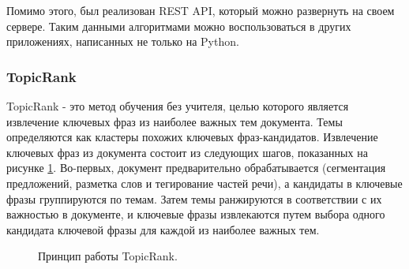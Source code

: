 \documentclass[14pt]{matmex-diploma-custom}
\begin{document}
Помимо этого, был реализован REST API, который можно развернуть на своем сервере.
Таким данными алгоритмами можно воспользоваться в других приложениях, написанных не
только на Python.


\subsubsection{TopicRank}
TopicRank - это метод обучения без учителя, целью которого является извлечение ключевых фраз из наиболее важных тем документа. Темы определяются как кластеры похожих ключевых фраз-кандидатов. Извлечение ключевых фраз из документа состоит из следующих шагов, показанных на рисунке \ref{topicrank}. Во-первых, документ предварительно обрабатывается (сегментация предложений, разметка слов и тегирование частей речи), а кандидаты в ключевые фразы группируются по темам. Затем темы ранжируются в соответствии с их важностью в документе, и ключевые фразы извлекаются путем выбора одного кандидата ключевой фразы для каждой из наиболее важных тем.

\begin{figure}[ht]
\begin{center}


\caption{
\label{topicrank}
        Принцип работы TopicRank.}
\end {center}
\end {figure}
\end{document}
